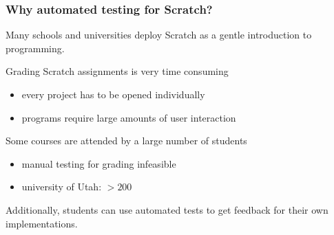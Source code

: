 
\begin{frame}
\end{frame}

\begin{frame}\frametitle{Why automated testing for Scratch?}
    Many schools and universities deploy Scratch as a gentle introduction to programming.

    \pause
    \bigskip

    Grading Scratch assignments is very \textcolor{upfim}{time consuming}
    \begin{itemize}
        \item every project has to be opened individually
        \item programs require large amounts of \textcolor{upfim}{user interaction}
    \end{itemize}

    \pause
    \bigskip

    Some courses are attended by a \textcolor{upfim}{large number of students}
    \begin{itemize}
        \item manual testing for grading infeasible
        \item university of Utah: $> 200$~\cite{itch}
    \end{itemize}

    \pause
    \bigskip

    Additionally, students can use automated tests to get feedback for their own implementations.
\end{frame}
